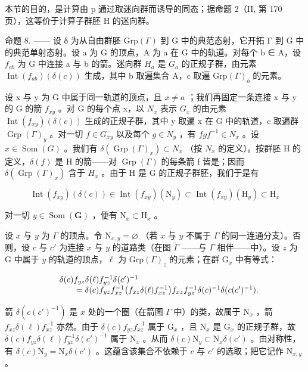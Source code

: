 本节的目的，是计算由 p 通过取迷向群而诱导的同态；据命题 2（II, 第 170 页），这等价于计算子群胚 H 的迷向群。

命题 8. —— 设 δ 为从自由群胚 \(\mathrm{Grp}(\Gamma)\) 到 G 中的典范态射，它开拓 Γ 到 G 中的典范单射态射。设 a 为 G 的顶点，A 为 a 在 G 中的轨道。对每个 b ∈ A，设 \(f_{ab}\) 为 G 中连接 a 与 b 的箭。迷向群 \(H_{a}\) 是 \(G_{a}\) 的正规子群，由元素 \(\operatorname{Int}(f_{ab})(\delta(c))\) 生成，其中 b 取遍集合 A，c 取遍 \(\mathrm{Grp}(\Gamma)_{b}\) 的元素。

设 x 与 y 为 G 中属于同一轨道的顶点，且 \(x \neq a\) ；我们再固定一条连接 x 与 y 的 G 的箭 \(f_{xy}\) 。对 G 的每个点 x，以 \(N_{x}\) 表示 \(G_{x}\) 的由元素 \(\operatorname{Int}(f_{xy})(\delta(c))\) 生成的正规子群，其中 y 取遍 x 在 G 中的轨道，c 取遍群 \(\operatorname{Grp}(\Gamma)_{y}\) 。对一切 \(f \in G_{xy}\) 以及每个 \(g \in N_{y}\) ，有 \(fgf^{-1} \in N_{x}\) 。设 \(x \in \operatorname{Som}(G)\) 。我们有 \(\delta(\operatorname{Grp}(\Gamma)_{x}) \subset N_{x}\) （按 \(N_{x}\) 的定义）。按群胚 H 的定义，\(\delta(f)\) 是 H 的箭——对 \(\operatorname{Grp}(\Gamma)\) 的每条箭 f 皆是；因而 \(\delta(\operatorname{Grp}(\Gamma)_{x})\) 含于 \(H_{x}\) 。由于 H 是 G 的正规子群胚，我们于是有

\[
\operatorname{Int} (f _ {x y}) (\delta (c)) \in \operatorname{Int} (f _ {x y}) (\mathrm{N} _ {y}) \subset \operatorname{Int} (f _ {x y}) (\mathrm{H} _ {y}) \subset \mathrm{H} _ {x}
\]

对一切 \(y \in \operatorname{Som}(\mathbf{G})\) ，便有 \(\mathrm{N}_x \subset \mathrm{H}_x\) 。

设 \(x\) 与 \(y\) 为 \(\Gamma\) 的顶点。令 \(\mathrm{N}_{x,y} = \varnothing\) （若 \(x\) 与 \(y\) 不属于 \(\Gamma\) 的同一连通分支）。否则，设 \(c\) 与 \(c'\) 为连接 \(x\) 与 \(y\) 的道路类（在图 \(\widetilde{\Gamma}\) ——与 \(\Gamma\) 相伴——中）。设 \(z\) 为 G 中属于 \(y\) 的轨道的顶点，\(\ell\) 为 \(\mathrm{Grp}(\Gamma)_z\) 的元素；在群 \(\mathrm{G}_x\) 中有等式：

\[
\begin{array}{r l} & {\delta (c) f _ {y z} \delta (\ell) f _ {y z} ^ {- 1} \delta (c ^ {\prime}) ^ {- 1}} \\ & {\qquad = \delta (c) f _ {y z} f _ {x z} ^ {- 1} \big (f _ {x z} \delta (\ell) f _ {x z} ^ {- 1} \big) f _ {x z} f _ {y z} ^ {- 1} \delta (c) ^ {- 1} \delta (c (c ^ {\prime}) ^ {- 1}).} \end{array}
\]

箭 \(\delta(c(c')^{-1})\) 是 \(x\) 处的一个圈（在箭图 \(\Gamma\) 中）的类，故属于 \(\mathrm{N}_x\) ，箭 \(f_{xz}\delta(\ell)f_{xz}^{-1}\) 亦然。由于 \(\delta(c)f_{yz}f_{xz}^{-1}\) 属于 \(\mathrm{G}_x\) ，且 \(\mathrm{N}_x\) 是 \(\mathrm{G}_x\) 的正规子群，故 \(\delta(c)f_{yz}\delta(\ell)f_{yz}^{-1}\delta(c')^{-1}\) 属于 \(\mathrm{N}_x\) 。从而 \(\delta(c)\mathrm{N}_y\subset \mathrm{N}_x\delta(c')\) 。由对称性，有 \(\delta(c)\mathrm{N}_y = \mathrm{N}_x\delta(c')\) 。这蕴含该集合不依赖于 \(c\) 与 \(c'\) 的选取；把它记作 \(\mathrm{N}_{x,y}\) 。

